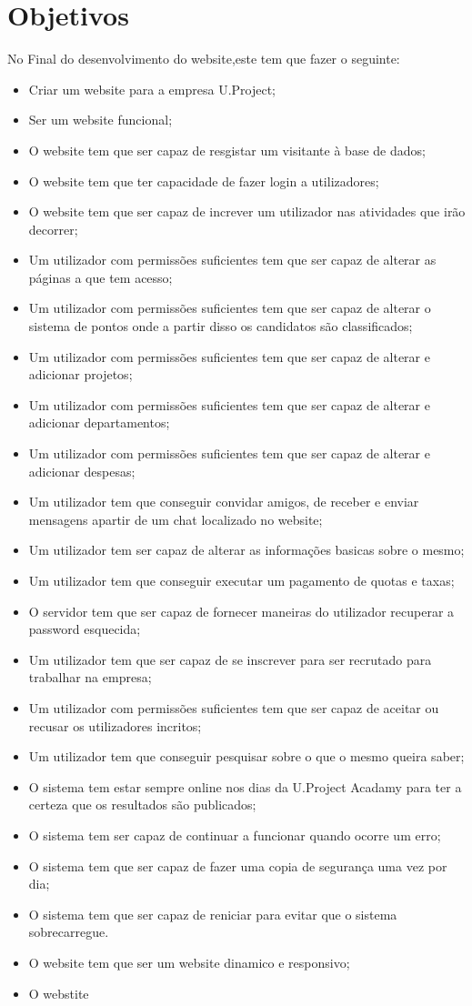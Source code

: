 \documentclass[11pt]{report}
\begin{document}
\section{Objetivos}
No Final do desenvolvimento do website,este tem que fazer o seguinte:
\begin{itemize}
\item Criar um website para a empresa U.Project;
\item Ser um website funcional;
\item O website tem que ser capaz de resgistar um visitante à base de dados;
\item O website tem que ter capacidade de fazer login a utilizadores;
\item O website tem que ser capaz de increver um utilizador nas atividades que irão decorrer;
\item Um utilizador com permissões suficientes tem que ser capaz de alterar as páginas a que tem acesso;
\item Um utilizador com permissões suficientes tem que ser capaz de alterar o sistema de pontos onde a partir disso os candidatos são classificados;
\item Um utilizador com permissões suficientes tem que ser capaz de alterar e adicionar projetos;
\item Um utilizador com permissões suficientes tem que ser capaz de alterar e adicionar departamentos;
\item Um utilizador com permissões suficientes tem que ser capaz de alterar e adicionar despesas;
\item Um utilizador tem que conseguir convidar amigos, de receber e enviar mensagens apartir de um chat localizado no website;
\item Um utilizador tem ser capaz de alterar as informações basicas sobre o mesmo;
\item Um utilizador tem que conseguir executar um pagamento de quotas e taxas;
\item O servidor tem que ser capaz de fornecer maneiras do utilizador recuperar a password esquecida;
\item Um utilizador tem que ser capaz de se inscrever para ser recrutado para trabalhar na empresa;
\item Um utilizador com permissões suficientes tem que ser capaz de aceitar ou recusar os utilizadores incritos;
\item Um utilizador tem que conseguir pesquisar sobre o que o mesmo queira saber;
\item O sistema tem estar sempre online nos dias da U.Project Acadamy para ter a certeza que os resultados são publicados;
\item O sistema tem ser capaz de continuar a funcionar quando ocorre um erro;
\item O sistema tem que ser capaz de fazer uma copia de segurança uma vez por dia;
\item O sistema tem que ser capaz de reniciar para evitar que o sistema sobrecarregue.
\item O website tem que ser um website dinamico e responsivo;
\item O webstite 
\end{itemize}
\end{document}
